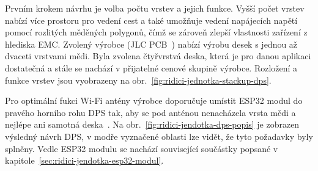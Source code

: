         Prvním krokem návrhu je volba počtu vrstev a jejich funkce. Vyšší počet vrstev nabízí více prostoru pro vedení cest a také umožňuje vedení napájecích napětí pomocí rozlitých měděných polygonů, čímž se zároveň zlepší vlastnosti zařízení z hlediska EMC. Zvolený výrobce (JLC PCB~\cite{jlcpcb}) nabízí výrobu desek s jednou až dvaceti vrstvami mědi. Byla zvolena čtyřvrstvá deska, která je pro danou aplikaci dostatečná a stále se nachází v přijatelné cenové skupině výrobce. Rozložení a funkce vrstev jsou vyobrazeny na obr.~\ref{fig:ridici-jednotka-stackup-dps}.

        Pro optimální fukci Wi-Fi antény výrobce doporučuje umístit ESP32 modul do pravého horního rohu DPS tak, aby se pod anténou nenacházela vrsta mědi a nejlépe ani samotná deska~\cite{esp32-hw-guidelines}. Na obr.~\ref{fig:ridici-jendotka-dps-popis} je zobrazen výsledný návrh DPS, v modře vyznačené oblasti lze vidět, že tyto požadavky byly splněny. Vedle ESP32 modulu se nachází související součástky popsané v kapitole~\ref{sec:ridici-jendotka-esp32-modul}.


